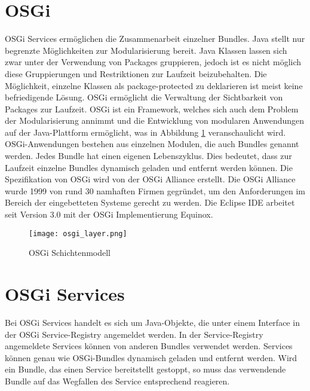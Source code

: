 \section{OSGi}{
\label{sec:OSGi}
\ac{OSGi} Services ermöglichen die Zusammenarbeit einzelner Bundles. Java stellt nur begrenzte Möglichkeiten zur Modularisierung bereit. Java Klassen lassen sich zwar unter der Verwendung von Packages gruppieren, jedoch ist es nicht möglich diese Gruppierungen und Restriktionen zur Laufzeit beizubehalten. Die Möglichkeit, einzelne Klassen als package-protected zu deklarieren ist meist keine befriedigende Lösung. \ac{OSGi} ermöglicht die Verwaltung der Sichtbarkeit von Packages zur Laufzeit. \ac{OSGi} ist ein Framework, welches sich auch dem Problem der Modularisierung annimmt und die Entwicklung von modularen Anwendungen auf der Java-Plattform ermöglicht, was in Abbildung \ref{fig:osgi_layer} veranschaulicht wird. \ac{OSGi}-Anwendungen bestehen aus einzelnen Modulen, die auch Bundles genannt werden. Jedes Bundle hat einen eigenen Lebenszyklus. Dies bedeutet, dass zur Laufzeit einzelne Bundles dynamisch geladen und entfernt werden können. Die Spezifikation von \ac{OSGi} wird von der \ac{OSGi} Alliance erstellt. Die \ac{OSGi} Alliance wurde 1999 von rund 30 namhaften Firmen gegründet, um den Anforderungen im Bereich der eingebetteten Systeme gerecht zu werden. \cite[S.3]{Queue} Die Eclipse \ac{IDE} arbeitet seit Version 3.0 mit der \ac{OSGi} Implementierung Equinox.  

\begin{figure}[htbp] 
\centering
     \texttt{[image: osgi\_layer.png]}
  \caption{OSGi Schichtenmodell \protect  \cite[aus S.2]{OSGi}}
  \label{fig:osgi_layer}
\end{figure}

}


\section{OSGi Services}{
\label{sec:OSGi_Services}
Bei \ac{OSGi} Services handelt es sich um Java-Objekte, die unter einem Interface in der \ac{OSGi} Service-Registry angemeldet werden. In der Service-Registry angemeldete Services können von anderen Bundles verwendet werden. Services können genau wie OSGi-Bundles dynamisch geladen und entfernt werden. Wird ein Bundle, das einen Service bereitstellt gestoppt, so muss das verwendende Bundle auf das Wegfallen des Service entsprechend reagieren. \cite[vgl.S.114]{OSGi}
}

